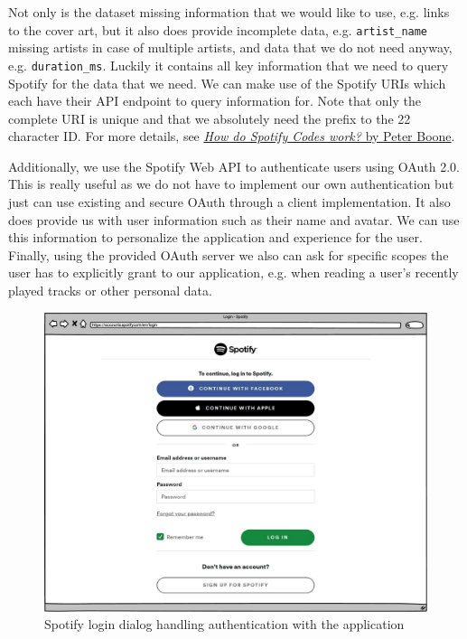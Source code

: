 Not only is the dataset missing information that we would like to use, e.g. links to the cover art, but it also does provide incomplete data, e.g. \texttt{artist\_name} missing artists in case of multiple artists, and data that we do not need anyway, e.g. \texttt{duration\_ms}. Luckily it contains all key information that we need to query Spotify for the data that we need. We can make use of the Spotify URIs which each have their API endpoint to query information for. Note that only the complete URI is unique and that we absolutely need the prefix to the 22 character ID. For more details, see \href{https://boonepeter.github.io/posts/2020-11-10-spotify-codes/}{\textit{How do Spotify Codes work?} by Peter Boone}.

Additionally, we use the Spotify Web API to authenticate users using OAuth 2.0. This is really useful as we do not have to implement our own authentication but just can use existing and secure OAuth through a client implementation. It also does provide us with user information such as their name and avatar. We can use this information to personalize the application and experience for the user. Finally, using the provided OAuth server we also can ask for specific scopes the user has to explicitly grant to our application, e.g. when reading a user's recently played tracks or other personal data.

\begin{figure}[bth]
    \centering
    \includegraphics[width=1.0\textwidth]{Graphics/Chapter2/spotify-login.pdf}
    \caption{Spotify login dialog handling authentication with the application}
    \label{fig:SpotifyLogin}
\end{figure}

